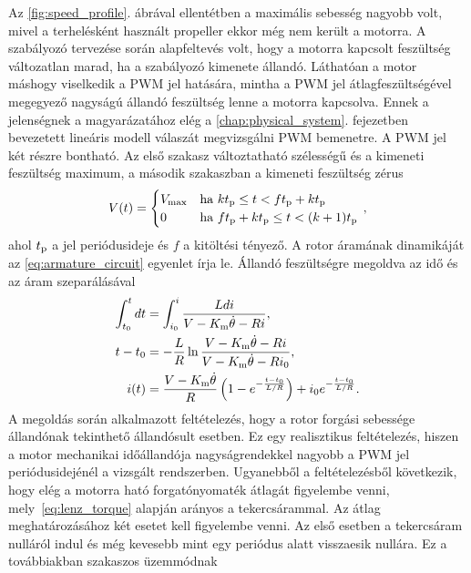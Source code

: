 Az \ref{fig:speed_profile}. ábrával ellentétben a maximális sebesség nagyobb volt, mivel a 
terhelésként használt propeller ekkor még nem került a motorra. A szabályozó tervezése során alapfeltevés volt, hogy 
a motorra kapcsolt feszültség változatlan marad, ha a szabályozó kimenete állandó. Láthatóan a motor máshogy viselkedik 
a PWM jel hatására, mintha a PWM jel átlagfeszültségével megegyező nagyságú állandó feszültség lenne a motorra kapcsolva.
Ennek a jelenségnek a magyarázatához elég a \ref{chap:physical_system}. fejezetben bevezetett lineáris modell válaszát 
megvizsgálni PWM bemenetre. A PWM jel két részre bontható. Az első szakasz változtatható szélességű és a 
kimeneti feszültség maximum, a második szakaszban a kimeneti feszültség zérus 
\begin{equation}
    V(t) = 
    \begin{cases}
        V_{\mathrm{max}} & \text{ha } kt_{\mathrm{p}} \le t < ft_{\mathrm{p}} + kt_{\mathrm{p}} \\
        0 & \text{ha } ft_{\mathrm{p}} + kt_{\mathrm{p}} \le t < (k+1)t_{\mathrm{p}}
    \end{cases}\,,
\end{equation}
ahol \(t_{\mathrm{p}}\) a jel periódusideje és \(f\) a kitöltési tényező.
A rotor áramának dinamikáját az \eqref{eq:armature_circuit} egyenlet írja le. 
Állandó feszültségre megoldva az idő és az áram szeparálásával
\begin{equation}
    \begin{split}
    \int_{t_0}^{t} dt &= \int_{i_0}^{i} \frac{L di}{V-K_{\mathrm{m}}\dot\theta - Ri}, \\
    t - t_0 &= -\frac{L}{R} \ln \frac{V-K_{\mathrm{m}}\dot\theta-Ri}{V-K_{\mathrm{m}}\dot\theta-Ri_0}, \\
    i(t) &= \frac{V-K_{\mathrm{m}}\dot\theta}{R}\left(1-e^{-\frac{t-t_0}{L/R}} \right) + i_0 e^{-\frac{t-t_0}{L/R}}. 
    \end{split}
\end{equation}
A megoldás során alkalmazott feltételezés, hogy a rotor forgási sebessége állandónak tekinthető állandósult esetben. 
Ez egy realisztikus feltételezés, hiszen a motor mechanikai időállandója nagyságrendekkel nagyobb a PWM jel periódusidejénél 
a vizsgált rendszerben. Ugyanebből a feltételezésből következik, hogy elég a motorra ható forgatónyomaték átlagát figyelembe venni, 
mely~\eqref{eq:lenz_torque} alapján arányos a tekercsárammal. Az átlag meghatározásához két esetet kell figyelembe venni. 
Az első esetben a tekercsáram nulláról indul és még kevesebb mint egy periódus alatt visszaesik nullára. Ez a továbbiakban szakaszos üzemmódnak 
